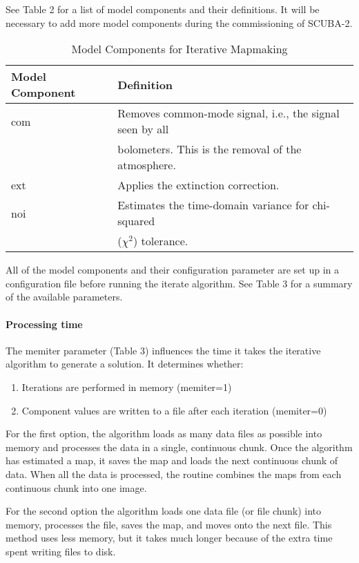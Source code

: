 \documentclass[twoside,11pt]{article}
\renewcommand{\_}{\texttt{\symbol{95}}}
\begin{document}
See Table 2 for a list of model components and their definitions. It
will be necessary to add more model components during the
commissioning of SCUBA-2.
\begin{table}
\begin{tabular}{ll}
 Model Component & Definition \\
\hline
 com  &  Removes common-mode signal, i.e., the signal seen by all \\
      &  bolometers. This is the removal of the atmosphere. \\
 ext  &  Applies the extinction correction. \\
 noi  &  Estimates the time-domain variance for chi-squared  \\
      &  ($\chi^2$) tolerance. \\
\end{tabular}
\caption{Model Components for Iterative Mapmaking}
\end{table}
All of the model components and their configuration parameter are set
up in a configuration file before running the iterate algorithm. See
Table 3 for a summary of the available parameters.

\paragraph{Processing time}

The memiter parameter (Table 3) influences the time it takes the iterative
algorithm to generate a solution. It determines whether:
\begin{enumerate}
\item Iterations are performed in memory (memiter=1)
\item Component values are written to a file after each iteration
  (memiter=0)
\end{enumerate}

For the first option, the algorithm loads as many data files as
possible into memory and processes the data in a single, continuous
chunk. Once the algorithm has estimated a map, it saves the map and
loads the next continuous chunk of data. When all the data is
processed, the routine combines the maps from each continuous chunk
into one image.

For the second option the algorithm loads one data file (or file
chunk) into memory, processes the file, saves the map, and moves onto
the next file. This method uses less memory, but it takes much longer
because of the extra time spent writing files to disk.
\end{document}
